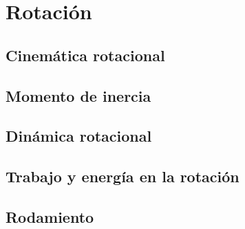 ﻿\documentclass[11pt,letterpaper,openany]{book}
\newcommand{\rutaraiz}{../..}
\begin{document}
\part{Rotación}



\chapter{Cinemática rotacional}





\chapter{Momento de inercia}





\chapter{Dinámica rotacional}





\chapter{Trabajo y energía en la rotación}





\chapter{Rodamiento}
\end{document}
